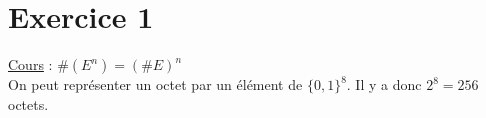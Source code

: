 \part{Exercice 1}

\underline{Cours} : $\#(E^n) = (\#E)^n$\\

On peut représenter un octet par un élément de $\{0,1\}^8$. Il y a donc $2^8 = 256$ octets.
